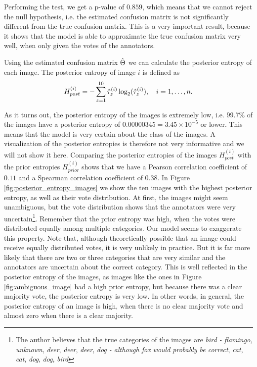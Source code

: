 Performing the test, we get a p-value of $0.859$, which means that we cannot
reject the null hypothesis, i.e. the estimated confusion matrix is
not significantly different from the true confusion matrix. This is a very
important result, because it shows that the model is able to approximate the
true confusion matrix very well, when only given the votes of the annotators.\bigskip

Using the estimated confusion matrix $\hat{\Theta}$ we can calculate the posterior
entropy of each image. The posterior entropy of image $i$ is defined as
\begin{equation}
    H_{post}^{(i)} = -\sum_{z=1}^{10} \hat{\tau}^{(i)}_z \log_2(\hat{\tau}^{(i)}_z), \quad i = 1, \ldots, n.
\end{equation}

As it turns out, the posterior entropy of the images is extremely low, i.e.
99.7\% of the images have a posterior entropy of $0.00000345 = 3.45\times 10^{-5}$
or lower. This means that the model is very certain about the class of the
images. A visualization of the posterior entropies is therefore not very
informative and we will not show it here. Comparing the posterior entropies of
the images $H_{post}^{(i)}$ with the prior entropies $H_{prior}^{(i)}$ shows
that we have a Pearson correlation coefficient of $0.11$ and a Spearman
correlation coefficient of $0.38$. In Figure \ref{fig:posterior_entropy_images}
we show the ten images with the highest posterior entropy, as well as their vote
distribution. At first, the images might seem unambiguous, but the vote
distribution shows that the annotators were very uncertain\footnote{The author
believes that the true categories of the images are \textit{bird - flamingo},
\textit{unknown}, \textit{deer}, \textit{deer}, \textit{deer}, \textit{dog -
although fox would probably be correct}, \textit{cat}, \textit{cat},
\textit{dog}, \textit{dog}, \textit{bird}}. Remember that the prior entropy was
high, when the votes were distributed equally among multiple categories. Our
model seems to exaggerate this property. Note that, although theoretically
possible that an image could receive equally distributed votes, it is very
unlikely in practice. But it is far more likely that there are two or three
categories that are very similar and the annotators are uncertain about the
correct category. This is well reflected in the posterior entropy of the images,
as images like the ones in Figure \ref{fig:ambiguous_image} had a high prior
entropy, but because there was a clear majority vote, the posterior entropy is
very low. In other words, in general, the posterior entropy of an image is high,
when there is no clear majority vote and almost zero when there is a clear
majority.\bigskip

